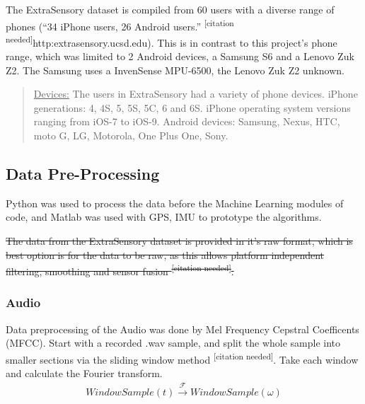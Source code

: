 \documentclass{UoNMCHA}
\newcommand{\citationneeded}{\textsuperscript{\color{blue} [citation needed]}}
\newcommand{\inlineQuote}[1]{``#1''}
\numberwithin{equation}{section}
\begin{document}
The ExtraSensory dataset is compiled from 60 users with a diverse range of phones (\inlineQuote{34 iPhone users, 26 Android users.}\citationneeded http:\/\/extrasensory.ucsd.edu\/). This is in contrast to this project's phone range, which was limited to 2 Android devices, a Samsung S6 and a Lenovo Zuk Z2. The Samsung uses a InvenSense MPU-6500, the Lenovo Zuk Z2 unknown.

\begin{quotation}
    \underline{Devices:}
    The users in ExtraSensory had a variety of phone devices.
    iPhone generations: 4, 4S, 5, 5S, 5C, 6 and 6S.
    iPhone operating system versions ranging from iOS-7 to iOS-9.
    Android devices: Samsung, Nexus, HTC, moto G, LG, Motorola, One Plus One, Sony.
\end{quotation}


\subsection{Data Pre-Processing}
Python was used to process the data before the Machine Learning modules of code, and Matlab was used with GPS, IMU to prototype the algorithms. 


 \sout{The data from the ExtraSensory dataset is provided in it's raw format, which is best option is for the data to be raw, as this allows platform independent filtering, smoothing and sensor fusion\citationneeded.} 

\subsubsection{Audio}
Data preprocessing of the Audio was done by Mel Frequency Cepstral Coefficents (MFCC). Start with a recorded .wav sample, and split the whole sample into smaller sections via the sliding window method\citationneeded. Take each window and calculate the Fourier transform.
\begin{gather}%
    WindowSample(t) \xrightarrow{\mathscr{F}}  WindowSample(\omega)
\end{gather}



\end{document}
